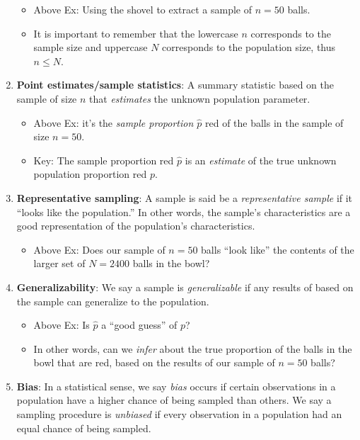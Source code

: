 \documentclass[12pt,]{krantz}
\providecommand{\tightlist}{%
  \setlength{\itemsep}{0pt}\setlength{\parskip}{0pt}}
\begin{document}
\begin{enumerate}
  \begin{itemize}
  \tightlist
  \item
    Above Ex: Using the shovel to extract a sample of \(n=50\) balls.
  \item
    It is important to remember that the lowercase \(n\) corresponds to
    the sample size and uppercase \(N\) corresponds to the population
    size, thus \(n \leq N\).
  \end{itemize}
\item
  \textbf{Point estimates/sample statistics}: A summary statistic based
  on the sample of size \(n\) that \emph{estimates} the unknown
  population parameter.

  \begin{itemize}
  \tightlist
  \item
    Above Ex: it's the \emph{sample proportion \(\widehat{p}\)} red of
    the balls in the sample of size \(n=50\).
  \item
    Key: The sample proportion red \(\widehat{p}\) is an \emph{estimate}
    of the true unknown population proportion red \(p\).
  \end{itemize}
\item
  \textbf{Representative sampling}: A sample is said be a
  \emph{representative sample} if it ``looks like the population.'' In
  other words, the sample's characteristics are a good representation of
  the population's characteristics.

  \begin{itemize}
  \tightlist
  \item
    Above Ex: Does our sample of \(n=50\) balls ``look like'' the
    contents of the larger set of \(N=2400\) balls in the bowl?
  \end{itemize}
\item
  \textbf{Generalizability}: We say a sample is \emph{generalizable} if
  any results of based on the sample can generalize to the population.

  \begin{itemize}
  \tightlist
  \item
    Above Ex: Is \(\widehat{p}\) a ``good guess'' of \(p\)?
  \item
    In other words, can we \emph{infer} about the true proportion of the
    balls in the bowl that are red, based on the results of our sample
    of \(n=50\) balls?
  \end{itemize}
\item
  \textbf{Bias}: In a statistical sense, we say \emph{bias} occurs if
  certain observations in a population have a higher chance of being
  sampled than others. We say a sampling procedure is \emph{unbiased} if
  every observation in a population had an equal chance of being
  sampled.


\end{enumerate}
\end{document}
